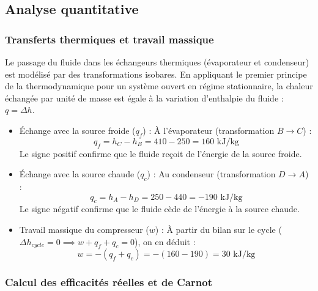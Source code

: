 \documentclass[a4paper,10pt,french]{scrartcl}
\begin{document}

 
\subsection{Analyse quantitative}

\subsubsection{Transferts thermiques et travail massique}

Le passage du fluide dans les échangeurs thermiques (évaporateur et condenseur) est modélisé par des transformations {isobares}. En appliquant le premier principe de la thermodynamique pour un système ouvert en régime stationnaire, la chaleur échangée par unité de masse est égale à la variation d'enthalpie du fluide : $q = \Delta h$.

\begin{itemize}
    \item {Échange avec la source froide ($q_f$) :} À l'évaporateur (transformation $B \to C$) :
    $$q_f = h_C - h_B = 410 - 250 = 160 \text{ kJ/kg}$$
    Le signe positif confirme que le fluide reçoit de l'énergie de la source froide.

    \item {Échange avec la source chaude ($q_c$) :} Au condenseur (transformation $D \to A$) :
    $$q_c = h_A - h_D = 250 - 440 = -190 \text{ kJ/kg}$$
    Le signe négatif confirme que le fluide cède de l'énergie à la source chaude.

    \item {Travail massique du compresseur ($w$) :} À partir du bilan sur le cycle ($\Delta h_{cycle} = 0 \implies w + q_f + q_c = 0$), on en déduit :
    $$w = -(q_f + q_c) = -(160 - 190) = 30 \text{ kJ/kg}$$
    \end{itemize}

\subsubsection{Calcul des efficacités réelles et de Carnot}
\end{document}
